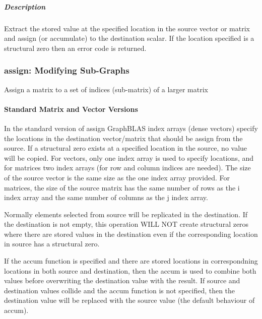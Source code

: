 \subparagraph{Description}

Extract the stored value at the specified location in the source vector or matrix and assign (or accumulate) to the destination scalar.  If the location specified is a structural zero then an error code is returned.


\subsubsection{{\sf assign}: Modifying Sub-Graphs}

Assign a matrix to a set of indices (sub-matrix) of a larger matrix

\paragraph{Standard Matrix and Vector Versions}

In the standard version of {\sf assign} GraphBLAS index arrays (dense vectors)
specify the locations in the destination vector/matrix that should be assign from
the source.  If a structural zero exists at a specified location in the source,
no value will be copied.  For vectors, only one index array is used to specify
locations, and for matrices two index arrays (for row and column indices are needed).
The size of the source vector is the same size as the one index array provided.
For matrices, the size of the source matrix has the same number of rows as the
{\sf i} index array and the same number of columns as the {\sf j} index array.

Normally elements selected from source will be replicated in the destination.  If the
destination is not empty, this operation WILL NOT create structural zeros where there
are stored values in the destination even if the corresponding location in source 
has a structural zero.

If the {\sf accum} function is specified and there are stored locations in correspondning
locations in both source and destination, then the
{\sf accum} is used to combine both values before overwriting the destination value
with the result.  If source and destination values collide and the {\sf accum} function is
not specified, then the destination value will be replaced with the source value (the
default behaviour of {\sf accum}).

